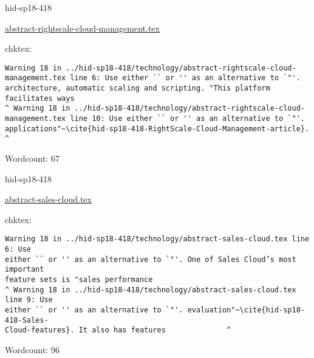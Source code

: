 \begin{IU}

hid-sp18-418

\href{https://github.com/cloudmesh-community/hid-sp18-418/blob/master//technology/abstract-rightscale-cloud-management.tex}{abstract-rightscale-cloud-management.tex}

 
chktex:
\begin{tiny}
\begin{verbatim}
Warning 18 in ../hid-sp18-418/technology/abstract-rightscale-cloud-
management.tex line 6: Use either `` or '' as an alternative to `"'.
architecture, automatic scaling and scripting. "This platform facilitates ways
^ Warning 18 in ../hid-sp18-418/technology/abstract-rightscale-cloud-
management.tex line 10: Use either `` or '' as an alternative to `"'.
applications"~\cite{hid-sp18-418-RightScale-Cloud-Management-article}.
^
\end{verbatim}
\end{tiny}

Wordcount: 67

\end{IU}



\begin{IU}

hid-sp18-418

\href{https://github.com/cloudmesh-community/hid-sp18-418/blob/master//technology/abstract-sales-cloud.tex}{abstract-sales-cloud.tex}

 
chktex:
\begin{tiny}
\begin{verbatim}
Warning 18 in ../hid-sp18-418/technology/abstract-sales-cloud.tex line 6: Use
either `` or '' as an alternative to `"'. One of Sales Cloud’s most important
feature sets is "sales performance
^ Warning 18 in ../hid-sp18-418/technology/abstract-sales-cloud.tex line 9: Use
either `` or '' as an alternative to `"'. evaluation"~\cite{hid-sp18-418-Sales-
Cloud-features}. It also has features              ^
\end{verbatim}
\end{tiny}

Wordcount: 96

\end{IU}



